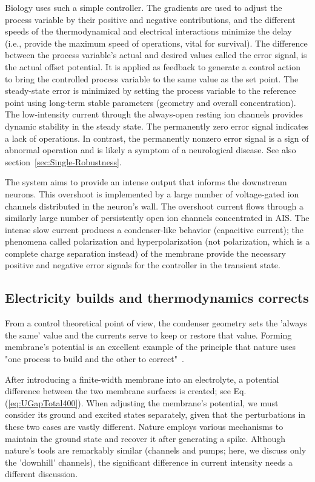 Biology uses such a simple controller.
The gradients are used to adjust the process variable by their positive and negative contributions, and the different speeds of the thermodynamical and electrical interactions minimize the delay (i.e., provide the maximum speed of operations, vital for survival).
The difference between the process variable's actual and desired values called the error signal, is the actual offset potential.
It is applied as feedback to generate a control action to bring the controlled process variable to the same value as the set point.
The steady-state error is minimized by setting the process variable to the reference point using long-term stable parameters (geometry and overall concentration).
The low-intensity current through the always-open resting ion channels provides dynamic stability in the steady state. The permanently zero error signal indicates a lack of operations.
In contrast, the permanently nonzero error signal is a sign of abnormal operation and is likely a symptom of a neurological disease.
See also section~\ref{sec:Single-Robustness}.

The system aims to provide an intense output that informs the downstream neurons.
This overshoot is implemented by a large number of voltage-gated ion channels distributed in the neuron's wall.
The overshoot current flows through a similarly large number of persistently open ion channels concentrated in 
\gls{AIS}.
The intense slow current produces a condenser-like behavior (capacitive current); the phenomena called polarization and hyperpolarization (not polarization, which is a complete charge separation instead) of the membrane provide the necessary positive and negative error signals for the controller in the transient state.



\subsection{Electricity builds and thermodynamics corrects\label{sec:Single-FixingPotential}}


From a control theoretical point of view, the condenser geometry sets
the 'always the same' value and the currents serve to keep or restore
that value.
Forming membrane's potential is an excellent example of the principle that nature uses "one process to build and the other
to correct"~\cite{BiologicalConservationLaw:2017}. 

After introducing a finite-width membrane into an electrolyte,
a potential difference between the two membrane surfaces is created; see Eq.(\ref{eq:UGapTotal400}).
When adjusting the membrane's potential, we must consider its ground and excited states separately,
given that the perturbations in these two cases are vastly different. Nature employs various mechanisms to maintain the ground state and recover it after generating a spike. Although nature's tools are remarkably similar (channels and pumps; here, we discuss only the 'downhill' channels), the significant difference in current intensity needs a different discussion.

